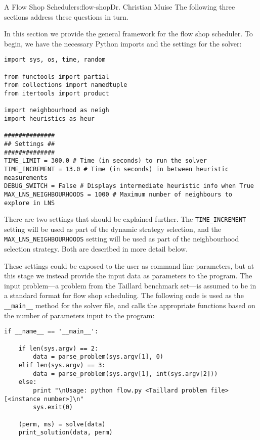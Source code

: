 \begin{aosachapter}{A Flow Shop Scheduler}{s:flow-shop}{Dr. Christian Muise}
The following three sections address these questions in turn.

\label{general-solver}

In this section we provide the general framework for the flow shop
scheduler. To begin, we have the necessary Python imports and the
settings for the solver:

\begin{verbatim}
import sys, os, time, random

from functools import partial
from collections import namedtuple
from itertools import product

import neighbourhood as neigh
import heuristics as heur

##############
## Settings ##
##############
TIME_LIMIT = 300.0 # Time (in seconds) to run the solver
TIME_INCREMENT = 13.0 # Time (in seconds) in between heuristic measurements
DEBUG_SWITCH = False # Displays intermediate heuristic info when True
MAX_LNS_NEIGHBOURHOODS = 1000 # Maximum number of neighbours to explore in LNS
\end{verbatim}

There are two settings that should be explained further. The
\texttt{TIME\_INCREMENT} setting will be used as part of the dynamic
strategy selection, and the \texttt{MAX\_LNS\_NEIGHBOURHOODS} setting
will be used as part of the neighbourhood selection strategy. Both are
described in more detail below.

These settings could be exposed to the user as command line parameters,
but at this stage we instead provide the input data as parameters to the
program. The input problem---a problem from the Taillard benchmark
set---is assumed to be in a standard format for flow shop scheduling.
The following code is used as the \texttt{\_\_main\_\_} method for the
solver file, and calls the appropriate functions based on the number of
parameters input to the program:

\begin{verbatim}
if __name__ == '__main__':

    if len(sys.argv) == 2:
        data = parse_problem(sys.argv[1], 0)
    elif len(sys.argv) == 3:
        data = parse_problem(sys.argv[1], int(sys.argv[2]))
    else:
        print "\nUsage: python flow.py <Taillard problem file> [<instance number>]\n"
        sys.exit(0)

    (perm, ms) = solve(data)
    print_solution(data, perm)
\end{verbatim}


\end{aosachapter}
